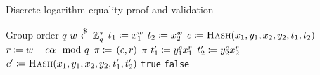 \begin{algorithm}[t]
\caption{Discrete logarithm equality proof and validation}
\label{alg:2_dlog_equality}
\begin{algorithmic}[1]
\Require Group order $q$
    \State $w \stackrel{\$}{\leftarrow}{} \mathbb{Z}_{q}^{*}$
    \State $t_{1} \coloneqq{} x_{1}^{w}$
    \State $t_{2} \coloneqq{} x_{2}^{w}$
    \State $c \coloneqq{} \textsc{Hash}(x_{1},y_{1},x_{2},y_{2},t_{1},t_{2})$
    \State $r \coloneqq{} w - c\alpha \mod q$
    \State $\pi \coloneqq{} \left( c,r \right)$
    \State \Return $\pi$
\EndProcedure
\State
{}
    \State $t_{1}' \coloneqq{} y_{1}^{c}x_{1}^{r}$
    \State $t_{2}' \coloneqq{} y_{2}^{c}x_{2}^{r}$
    \State $c' \coloneqq{}\textsc{Hash}(x_{1},y_{1},x_{2},y_{2},t_{1}',t_{2}')$
        \State \Return \texttt{true}
    \Else
        \State \Return \texttt{false}
    \EndIf
\EndProcedure
\end{algorithmic}
\end{algorithm}
